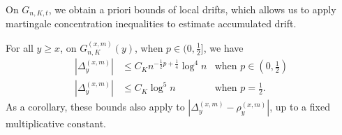 \documentclass[EJP]{ejpecp} %
\begin{document}
On $G_{n, K, t}$, we obtain a priori bounds of local drifts, which allows us to apply martingale concentration inequalities to estimate accumulated drift.
\begin{lemma}\label{lm:lipchitz-bound-on-good-event}
	For all  $y \ge x$, on $G_{n, K}^{(x,m)}(y)$, when $p \in (0,\frac{1}{2}]$,  we have
	\begin{align*}
		\left| \Delta_y^{(x,m)} \right| &\le C_K n^{-\frac{1}{2}p + \frac{1}{4}} \log^4 n &\text{when }p \in \left(0,\frac{1}{2}\right)\\
		\left| \Delta_y^{(x,m)} \right| &\le C_K \log^5 n &\text{when }p = \frac{1}{2}
		.\end{align*}
	As a corollary, these bounds also apply to $\left| \Delta_y^{(x,m)} - \rho_y^{(x,m)} \right| $, up to a fixed multiplicative constant.
\end{lemma}
\end{document}
